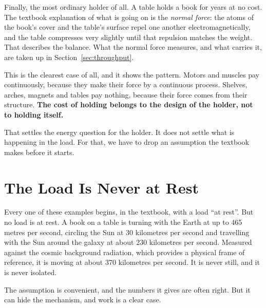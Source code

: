 \documentclass[11pt,a4paper]{article}
\begin{document}
Finally, the most ordinary holder of all. A table holds a book for years at no cost. The textbook explanation of what is going on is the \emph{normal force}: the atoms of the book's cover and the table's surface repel one another electromagnetically, and the table compresses very slightly until that repulsion matches the weight. That describes the balance. What the normal force measures, and what carries it, are taken up in Section~\ref{sec:throughput}.

This is the clearest case of all, and it shows the pattern. Motors and muscles pay continuously, because they make their force by a continuous process. Shelves, arches, magnets and tables pay nothing, because their force comes from their structure. \textbf{The cost of holding belongs to the design of the holder, not to holding itself.}

That settles the energy question for the holder. It does not settle what is happening in the load. For that, we have to drop an assumption the textbook makes before it starts.

\section{The Load Is Never at Rest}

Every one of these examples begins, in the textbook, with a load ``at rest''. But no load is at rest. A book on a table is turning with the Earth at up to 465 metres per second, circling the Sun at 30 kilometres per second and travelling with the Sun around the galaxy at about 230 kilometres per second. Measured against the cosmic background radiation, which provides a physical frame of reference, it is moving at about 370 kilometres per second. It is never still, and it is never isolated.

 The assumption is convenient, and the numbers it gives are often right. But it can hide the mechanism, and work is a clear case.
\end{document}
